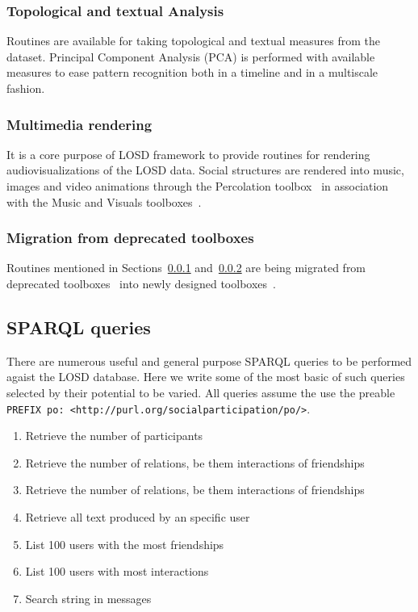 \documentclass[review]{elsarticle}
\newcommand{\textttt}[1] {\texttt{\footnotesize#1}}
\begin{document}
\subsubsection{Topological and textual Analysis}\label{ana}
Routines are available for taking topological and textual measures from
the dataset.
Principal Component Analysis (PCA) is performed with available measures
to ease pattern recognition both in a timeline and in a multiscale
fashion.

\subsubsection{Multimedia rendering}\label{media}
It is a core purpose of LOSD framework to provide routines for rendering
audiovisualizations of the LOSD data.
Social structures are rendered into music, images and video animations
through the Percolation toolbox~\cite{percolation} in association with
the Music and Visuals toolboxes~\cite{music,visuals}.

\subsubsection{Migration from deprecated toolboxes}
Routines mentioned in Sections~\ref{ana} and~\ref{media} are being migrated from deprecated
toolboxes~\cite{gmaneLegacy,percolationLegacy} into newly designed
toolboxes~\cite{percolation,visuals}.

\subsection{SPARQL queries}\label{queries}
There are numerous useful and general purpose SPARQL queries to be performed agaist the LOSD database.
Here we write some of the most basic of such queries selected by their potential to be varied.
All queries assume the use the preable \textttt{PREFIX po: <http://purl.org/socialparticipation/po/>}.
\begin{enumerate}[leftmargin=0cm]
	\item Retrieve the number of participants
	\item Retrieve the number of relations, be them interactions of friendships
	\item Retrieve the number of relations, be them interactions of friendships
	\item Retrieve all text produced by an specific user
	\item List 100 users with the most friendships
	\item List 100 users with most interactions
	\item Search string in messages
\end{enumerate}
\end{document}
